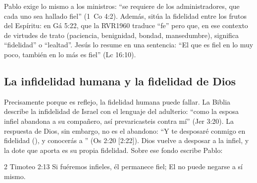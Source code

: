 Pablo exige lo mismo a los ministros: ``se requiere de los administradores, que cada uno sea hallado fiel'' (1~Co 4:2). Además, sitúa la fidelidad entre los frutos del Espíritu:  en Gá 5:22, que la RVR1960 traduce ``fe'' pero que, en ese contexto de virtudes de trato (paciencia, benignidad, bondad, mansedumbre), significa ``fidelidad'' o ``lealtad''. Jesús lo resume en una sentencia: ``El que es fiel en lo muy poco, también en lo más es fiel'' (Lc 16:10).


\subsection{La infidelidad humana y la fidelidad de Dios}
Precisamente porque es reflejo, la fidelidad humana puede fallar. La Biblia describe la infidelidad de Israel con el lenguaje del adulterio: ``como la esposa infiel abandona a su compañero, así prevaricasteis contra mí'' (Jer 3:20). La respuesta de Dios, sin embargo, no es el abandono: ``Y te desposaré conmigo en fidelidad (), y conocerás a \SENOR'' (Os 2:20 [2:22]). Dios vuelve a desposar a la infiel, y la dote que aporta es su propia fidelidad. Sobre ese fondo escribe Pablo:

\begin{verso}{2 Timoteo 2:13}
Si fuéremos infieles, él permanece fiel; El no puede negarse a sí mismo.
\end{verso}

